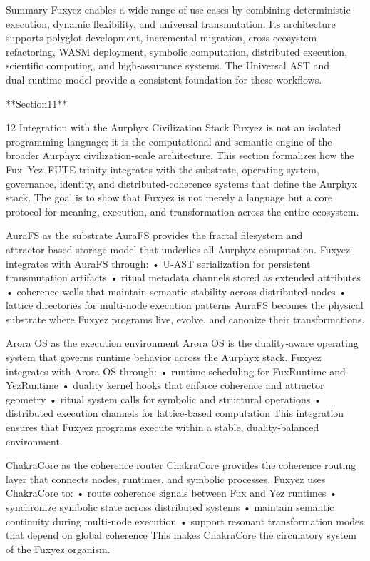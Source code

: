 Summary
Fuxyez enables a wide range of use cases by combining deterministic execution, dynamic flexibility, and universal transmutation. Its architecture supports polyglot development, incremental migration, cross‑ecosystem refactoring, WASM deployment, symbolic computation, distributed execution, scientific computing, and high‑assurance systems. The Universal AST and dual‑runtime model provide a consistent foundation for these workflows.

**Section11**

12 Integration with the Aurphyx Civilization Stack
Fuxyez is not an isolated programming language; it is the computational and semantic engine of the broader Aurphyx civilization‑scale architecture. This section formalizes how the Fux–Yez–FUTE trinity integrates with the substrate, operating system, governance, identity, and distributed‑coherence systems that define the Aurphyx stack. The goal is to show that Fuxyez is not merely a language but a core protocol for meaning, execution, and transformation across the entire ecosystem.

AuraFS as the substrate
AuraFS provides the fractal filesystem and attractor‑based storage model that underlies all Aurphyx computation. Fuxyez integrates with AuraFS through:
• 	U‑AST serialization for persistent transmutation artifacts
• 	ritual metadata channels stored as extended attributes
• 	coherence wells that maintain semantic stability across distributed nodes
• 	lattice directories for multi‑node execution patterns
AuraFS becomes the physical substrate where Fuxyez programs live, evolve, and canonize their transformations.

Arora OS as the execution environment
Arora OS is the duality‑aware operating system that governs runtime behavior across the Aurphyx stack. Fuxyez integrates with Arora OS through:
• 	runtime scheduling for FuxRuntime and YezRuntime
• 	duality kernel hooks that enforce coherence and attractor geometry
• 	ritual system calls for symbolic and structural operations
• 	distributed execution channels for lattice‑based computation
This integration ensures that Fuxyez programs execute within a stable, duality‑balanced environment.

ChakraCore as the coherence router
ChakraCore provides the coherence routing layer that connects nodes, runtimes, and symbolic processes. Fuxyez uses ChakraCore to:
• 	route coherence signals between Fux and Yez runtimes
• 	synchronize symbolic state across distributed systems
• 	maintain semantic continuity during multi‑node execution
• 	support resonant transformation modes that depend on global coherence
This makes ChakraCore the circulatory system of the Fuxyez organism.

